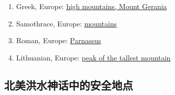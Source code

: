 \documentclass[10pt,twocolumn,letterpaper]{article}
\begin{document}
\begin{flushleft}
\begin{enumerate}
\item Greek, Europe: \href{http://www.talkorigins.org/faqs/flood-myths.html#Greek}{high mountains, Mount Gerania}
\item Samothrace, Europe: \href{http://www.talkorigins.org/faqs/flood-myths.html#Samothrace}{mountains}
\item Roman, Europe: \href{http://www.talkorigins.org/faqs/flood-myths.html#Roman}{Parnassus}
\item Lithuanian, Europe: \href{http://www.talkorigins.org/faqs/flood-myths.html#Lithuanian}{peak of the tallest mountain}
\end{enumerate}
\end{flushleft}

\subsection{北美洪水神话中的安全地点}
\end{document}
